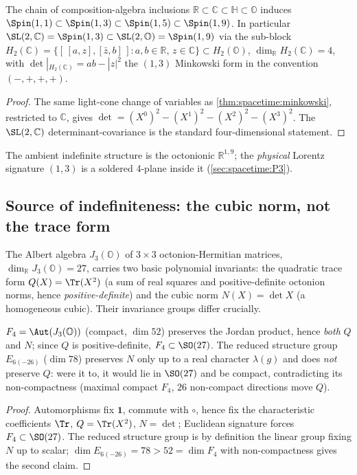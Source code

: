 \begin{theorem}
\label{thm:spacetime:lorentz4}
The chain of composition-algebra inclusions $\mathbb R\subset\mathbb C\subset\mathbb H\subset\mathbb O$
induces $\Spin(1,1)\subset\Spin(1,3)\subset\Spin(1,5)\subset\Spin(1,9)$. In particular
$\SL(2,\mathbb C)=\Spin(1,3)\subset\SL(2,\mathbb O)=\Spin(1,9)$ via the sub-block
$H_2(\mathbb C)=\{[\,[a,z],[\bar z,b]\,]:a,b\in\mathbb R,\,z\in\mathbb C\}\subset H_2(\mathbb O)$,
$\dim_{\mathbb R}H_2(\mathbb C)=4$, with $\det|_{H_2(\mathbb C)}=ab-|z|^2$ the $(1,3)$
Minkowski form in the convention $(-,+,+,+)$.
\end{theorem}
\begin{proof}
The same light-cone change of variables as \autoref{thm:spacetime:minkowski},
restricted to $\mathbb C$, gives $\det=(X^0)^2-(X^1)^2-(X^2)^2-(X^3)^2$. The
$\SL(2,\mathbb C)$ determinant-covariance is the standard four-dimensional statement.
\end{proof}

The ambient indefinite structure is the octonionic $\mathbb R^{1,9}$; the
\emph{physical} Lorentz signature $(1,3)$ is a soldered 4-plane inside it
(\autoref{sec:spacetime:P3}).

\subsection{Source of indefiniteness: the cubic norm, not the trace form}
\label{sec:spacetime:norm}

The Albert algebra $J_3(\mathbb O)$ of $3\times3$ octonion-Hermitian matrices,
$\dim_{\mathbb R}J_3(\mathbb O)=27$, carries two basic polynomial invariants: the
quadratic trace form $Q(X)=\Tr(X^2)$ (a sum of real squares and positive-definite
octonion norms, hence \emph{positive-definite}) and the cubic norm
$N(X)=\det X$ (a homogeneous cubic). Their invariance groups differ crucially.

\begin{theorem}
\label{thm:spacetime:groups}
$F_4=\Aut(J_3(\mathbb O))$ (compact, $\dim 52$) preserves the Jordan product, hence
\emph{both} $Q$ and $N$; since $Q$ is positive-definite, $F_4\subset\SO(27)$. The
reduced structure group $E_{6(-26)}$ ($\dim 78$) preserves $N$ only up to a real
character $\lambda(g)$ and does \emph{not} preserve $Q$: were it to, it would lie in
$\SO(27)$ and be compact, contradicting its non-compactness (maximal compact $F_4$,
$26$ non-compact directions move $Q$).
\end{theorem}
\begin{proof}
Automorphisms fix $\mathbf 1$, commute with $\circ$, hence fix the characteristic
coefficients $\Tr$, $Q=\Tr(X^2)$, $N=\det$; Euclidean signature forces
$F_4\subset\SO(27)$. The reduced structure group is by definition the linear group
fixing $N$ up to scalar; $\dim E_{6(-26)}=78>52=\dim F_4$ with non-compactness gives
the second claim.
\end{proof}

